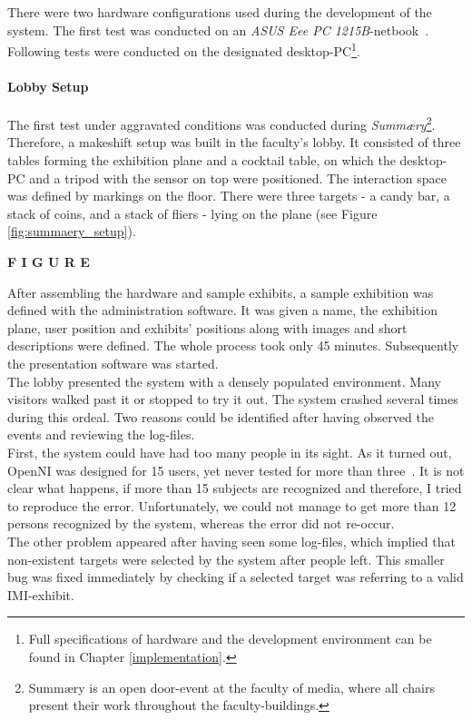There were two hardware configurations used during the development of the system. The first test was conducted on an \textit{ASUS Eee PC 1215B}-netbook~\cite{Eee1215B}. Following tests were conducted on the designated desktop-PC\footnote{Full specifications of hardware and the development environment can be found in Chapter \ref{implementation}.}.


\paragraph{Lobby Setup} The first test under aggravated conditions was conducted during \textit{Summ\ae{}ry}\footnote{Summ\ae{}ry is an open door-event at the faculty of media, where all chairs present their work throughout the faculty-buildings.}. Therefore, a makeshift setup was built in the faculty's lobby. It consisted of three tables forming the exhibition plane and a cocktail table, on which the desktop-PC and a tripod with the sensor on top were positioned. The interaction space was defined by markings on the floor. There were three targets - a candy bar, a stack of coins, and a stack of fliers - lying on the plane (see Figure \ref{fig:summaery_setup}).

\textbf{F I G U R E}

After assembling the hardware and sample exhibits, a sample exhibition was defined with the administration software. It was given a name, the exhibition plane, user position and exhibits' positions along with images and short descriptions were defined. The whole process took only 45 minutes. Subsequently the presentation software was started.
\\
The lobby presented the system with a densely populated environment. Many visitors walked past it or stopped to try it out. The system crashed several times during this ordeal. Two reasons could be identified after having observed the events and reviewing the log-files.
\\
First, the system could have had too many people in its sight. As it turned out, OpenNI was designed for 15 users, yet never tested for more than three~\cite{MaxUsersOpenNI}. It is not clear what happens, if more than 15 subjects are recognized and therefore, I tried to reproduce the error. Unfortunately, we could not manage to get more than 12 persons recognized by the system, whereas the error did not re-occur.
\\
The other problem appeared after having seen some log-files, which implied that non-existent targets were selected by the system after people left. This smaller bug was fixed immediately by checking if a selected target was referring to a valid \ac{IMI}-exhibit. 

